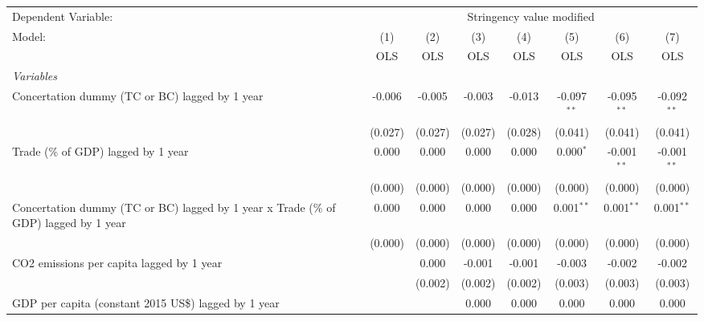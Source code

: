 
\begingroup
\centering
\begin{tabular}{lccccccc}
   \toprule
   Dependent Variable: & \multicolumn{7}{c}{Stringency value modified}\\
   Model:                                                                               & (1)     & (2)     & (3)     & (4)     & (5)           & (6)           & (7)\\  
                                                                                        &  OLS    & OLS     & OLS     & OLS     & OLS           & OLS           & OLS\\  
   \midrule
   \emph{Variables}\\
   Concertation dummy (TC or BC) lagged by 1 year                                       & -0.006  & -0.005  & -0.003  & -0.013  & -0.097$^{**}$ & -0.095$^{**}$ & -0.092$^{**}$\\   
                                                                                        & (0.027) & (0.027) & (0.027) & (0.028) & (0.041)       & (0.041)       & (0.041)\\   
   Trade (\% of GDP) lagged by 1 year                                                   & 0.000   & 0.000   & 0.000   & 0.000   & 0.000$^{*}$   & -0.001$^{**}$ & -0.001$^{**}$\\   
                                                                                        & (0.000) & (0.000) & (0.000) & (0.000) & (0.000)       & (0.000)       & (0.000)\\   
   Concertation dummy (TC or BC) lagged by 1 year x Trade (\% of GDP) lagged by 1 year  & 0.000   & 0.000   & 0.000   & 0.000   & 0.001$^{**}$  & 0.001$^{**}$  & 0.001$^{**}$\\   
                                                                                        & (0.000) & (0.000) & (0.000) & (0.000) & (0.000)       & (0.000)       & (0.000)\\   
   CO2 emissions per capita lagged by 1 year                                            &         & 0.000   & -0.001  & -0.001  & -0.003        & -0.002        & -0.002\\   
                                                                                        &         & (0.002) & (0.002) & (0.002) & (0.003)       & (0.003)       & (0.003)\\   
   GDP per capita (constant 2015 US\$) lagged by 1 year                                 &         &         & 0.000   & 0.000   & 0.000         & 0.000         & 0.000\\   

\end{tabular}
